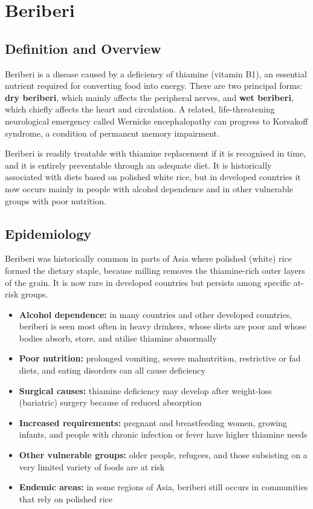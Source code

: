 \chapter{Beriberi}

\section*{Definition and Overview}
Beriberi is a disease caused by a deficiency of thiamine (vitamin B1), an essential nutrient required for converting food into energy. There are two principal forms: \textbf{dry beriberi}, which mainly affects the peripheral nerves, and \textbf{wet beriberi}, which chiefly affects the heart and circulation. A related, life-threatening neurological emergency called Wernicke encephalopathy can progress to Korsakoff syndrome, a condition of permanent memory impairment.

Beriberi is readily treatable with thiamine replacement if it is recognised in time, and it is entirely preventable through an adequate diet. It is historically associated with diets based on polished white rice, but in developed countries it now occurs mainly in people with alcohol dependence and in other vulnerable groups with poor nutrition.

\section*{Epidemiology}
Beriberi was historically common in parts of Asia where polished (white) rice formed the dietary staple, because milling removes the thiamine-rich outer layers of the grain. It is now rare in developed countries but persists among specific at-risk groups.

\begin{itemize}
    \item \textbf{Alcohol dependence:} in many countries and other developed countries, beriberi is seen most often in heavy drinkers, whose diets are poor and whose bodies absorb, store, and utilise thiamine abnormally
    \item \textbf{Poor nutrition:} prolonged vomiting, severe malnutrition, restrictive or fad diets, and eating disorders can all cause deficiency
    \item \textbf{Surgical causes:} thiamine deficiency may develop after weight-loss (bariatric) surgery because of reduced absorption
    \item \textbf{Increased requirements:} pregnant and breastfeeding women, growing infants, and people with chronic infection or fever have higher thiamine needs
    \item \textbf{Other vulnerable groups:} older people, refugees, and those subsisting on a very limited variety of foods are at risk
    \item \textbf{Endemic areas:} in some regions of Asia, beriberi still occurs in communities that rely on polished rice
\end{itemize}

